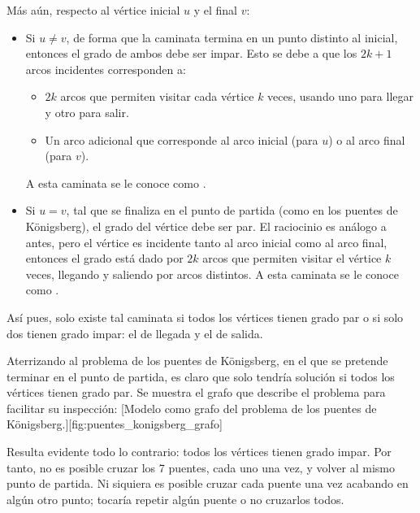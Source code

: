 Más aún, respecto al vértice inicial \(u\) y el final \(v\):
\begin{itemize}
  \item Si \(u \neq v\), de forma que la caminata termina en un punto distinto al inicial, entonces el grado de ambos debe ser impar. Esto se debe a que los $2k + 1$ arcos incidentes corresponden a:
  \begin{itemize}
    \item $2k$ arcos que permiten visitar cada vértice $k$ veces, usando uno para llegar y otro para salir.
    \item Un arco adicional que corresponde al arco inicial (para \(u\)) o al arco final (para \(v\)).
  \end{itemize}
  A esta caminata se le conoce como .
  \item Si \(u = v\), tal que se finaliza en el punto de partida (como en los puentes de Königsberg), el grado del vértice debe ser par. El raciocinio es análogo a antes, pero el vértice es incidente tanto al arco inicial como al arco final, entonces el grado está dado por $2k$ arcos que permiten visitar el vértice $k$ veces, llegando y saliendo por arcos distintos. A esta caminata se le conoce como .
\end{itemize}

Así pues, solo existe tal caminata si todos los vértices tienen grado par o si solo dos tienen grado impar: el de llegada y el de salida.  

Aterrizando al problema de los puentes de Königsberg, en el que se pretende terminar en el punto de partida, es claro que solo tendría solución si todos los vértices tienen grado par. Se muestra el grafo que describe el problema para facilitar su inspección:
[Modelo como grafo del problema de los puentes de Königsberg.][fig:puentes_konigsberg_grafo]

Resulta evidente todo lo contrario: todos los vértices tienen grado impar. Por tanto, no es posible cruzar los 7 puentes, cada uno una vez, y volver al mismo punto de partida. Ni siquiera es posible cruzar cada puente una vez acabando en algún otro punto; tocaría repetir algún puente o no cruzarlos todos.